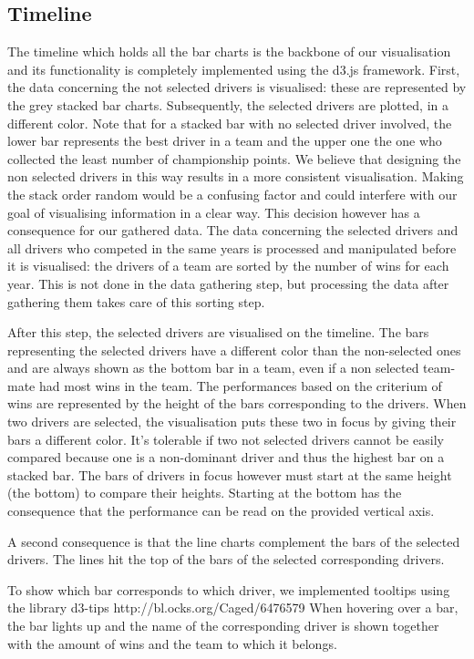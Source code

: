 \documentclass{sigchi}
\begin{document}
\subsection{Timeline} %
\label{sub:timeline}
The timeline which holds all the bar charts is the backbone of our visualisation and its functionality is completely implemented using the d3.js framework. First, the data concerning the not selected drivers is visualised: these are represented by the grey stacked bar charts. Subsequently, the selected drivers are plotted, in a different color. Note that for a stacked bar with no selected driver involved, the lower bar represents the best driver in a team and the upper one the one who collected the least number of championship points. We believe that designing the non selected drivers in this way results in a more consistent visualisation. Making the stack order random would be a confusing factor and could interfere with our goal of visualising information in a clear way. This decision however has a consequence for our gathered data. The data concerning the selected drivers and all drivers who competed in the same years is processed and manipulated before it is visualised: the drivers of a team are sorted by the number of wins for each year. This is not done in the data gathering step, but processing the data after gathering them takes care of this sorting step.

After this step, the selected drivers are visualised on the timeline. The bars representing the selected drivers have a different color than the non-selected ones and are always shown as the bottom bar in a team, even if a non selected team-mate had most wins in the team. The performances based on the criterium of wins are represented by the height of the bars corresponding to the drivers. When two drivers are selected, the visualisation puts these two in focus by giving their bars a different color. It's tolerable if two not selected drivers cannot be easily compared because one is a non-dominant driver and thus the highest bar on a stacked bar. The bars of drivers in focus however must start at the same height (the bottom) to compare their heights. Starting at the bottom has the consequence that the performance can be read on the provided vertical axis.


A second consequence is that the line charts complement the bars of the selected drivers. The lines hit the top of the bars of the selected corresponding drivers.

To show which bar corresponds to which driver, we implemented tooltips using the library d3-tips http://bl.ocks.org/Caged/6476579
When hovering over a bar, the bar lights up and the name of the corresponding driver is shown together with the amount of wins and the team to which it belongs.
\end{document}
